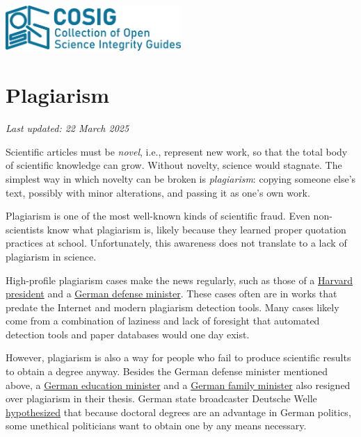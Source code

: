 \documentclass[letterpaper, 12pt]{article}
\begin{document}
\flushleft
\includegraphics[width=0.5\textwidth]{img/home/241017_final_logo_mockup.png}

\section*{Plagiarism}
\textit{Last updated: 22 March 2025}

Scientific articles must be \emph{novel}, i.e., represent new work, so that the total body of scientific knowledge can grow.
Without novelty, science would stagnate.
The simplest way in which novelty can be broken is \emph{plagiarism}: copying someone else's text, possibly with minor alterations, and passing it as one's own work.

Plagiarism is one of the most well-known kinds of scientific fraud.
Even non-scientists know what plagiarism is, likely because they learned proper quotation practices at school.
Unfortunately, this awareness does not translate to a lack of plagiarism in science.

High-profile plagiarism cases make the news regularly, such as those of a \href{https://www.theguardian.com/education/2024/jan/06/harvard-claudine-gay-plagiarism}{Harvard president} and a \href{https://www.bbc.com/news/world-europe-12504347}{German defense minister}.
These cases often are in works that predate the Internet and modern plagiarism detection tools.
Many cases likely come from a combination of laziness and lack of foresight that automated detection tools and paper databases would one day exist.

However, plagiarism is also a way for people who fail to produce scientific results to obtain a degree anyway.
Besides the German defense minister mentioned above, 
a \href{https://www.bbc.com/news/world-europe-21395102}{German education minister} 
and a \href{https://www.politico.eu/article/german-family-minister-franziska-giffey-resigns-over-plagiarism-accusations-berlin-mayor-bid/}{German family minister} also resigned over plagiarism in their thesis.
German state broadcaster Deutsche Welle \href{https://www.dw.com/en/why-do-german-politicians-so-often-stumble-over-phd-plagiarism-allegations/a-57651910}{hypothesized} that because doctoral degrees are an advantage in German politics, some unethical politicians want to obtain one by any means necessary.
\end{document}
